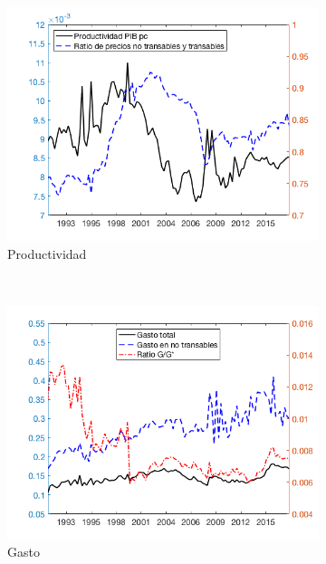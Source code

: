\documentclass[12pt,letterpaper]{article}
\begin{document}
\begin{figure}
\begin{subfigure}[b]{0.4\textwidth}
        \includegraphics[width=\textwidth]{fig11}
        \caption{Productividad}
    \end{subfigure}
    ~ %
    \begin{subfigure}[b]{0.4\textwidth}
        \includegraphics[width=\textwidth]{fig12}
        \caption{Gasto}
    \end{subfigure}
    \begin{subfigure}[b]{0.4\textwidth}

\end{subfigure}
\end{figure}
\end{document}
